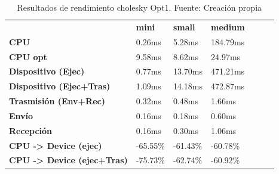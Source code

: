 \begin{table}[H]
    \centering
    \begin{tabular}{lllllll}
    \rowcolor[HTML]{DAE8FC} \ &  \textbf{mini} &  \textbf{	small} &  \textbf{	medium} \\
    \cellcolor[HTML]{DAE8FC} \textbf{CPU} & 0.26ms & 	5.28ms & 	184.79ms \\
    \rowcolor[HTML]{EFEFEF} \cellcolor[HTML]{DAE8FC} \textbf{CPU opt} & 9.58ms & 	8.62ms & 	24.97ms \\
    \cellcolor[HTML]{DAE8FC} \textbf{Dispositivo (Ejec)} & 0.77ms & 	13.70ms & 	471.21ms \\
    \rowcolor[HTML]{EFEFEF} \cellcolor[HTML]{DAE8FC} \textbf{Dispositivo (Ejec+Tras)} & 1.09ms & 	14.18ms & 	472.87ms \\
    \cellcolor[HTML]{DAE8FC} \textbf{Trasmisión (Env+Rec)} & 0.32ms & 	0.48ms & 	1.66ms \\
    \rowcolor[HTML]{EFEFEF} \cellcolor[HTML]{DAE8FC} \textbf{Envío} & 0.16ms & 	0.18ms & 	0.60ms \\
    \cellcolor[HTML]{DAE8FC} \textbf{Recepción} & 0.16ms & 	0.30ms & 	1.06ms \\
    \rowcolor[HTML]{EFEFEF} \cellcolor[HTML]{DAE8FC} \textbf{CPU -> Device (ejec)} & -65.55\% & 	-61.43\% & 	-60.78\% \\
    \cellcolor[HTML]{DAE8FC} \textbf{CPU -> Device (ejec+Tras)} & -75.73\% & 	-62.74\% & 	-60.92\% \\
    \end{tabular}
    \caption[Resultados de rendimiento cholesky Opt1]{{Resultados de rendimiento cholesky Opt1. Fuente: Creación propia}}
    \label{table_test_cholesky_Opt1_hw_performanceResults}
\end{table}